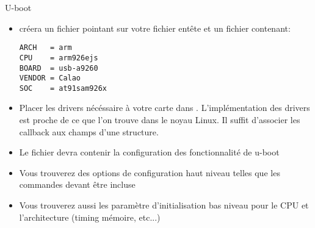 \begin{frame}[fragile=singleslide]{U-boot}
  \begin{itemize}
  \item {} créera  un fichier  pointant sur
    votre fichier entête et un fichier  contenant:
    \begin{lstlisting}
ARCH   = arm
CPU    = arm926ejs
BOARD  = usb-a9260
VENDOR = Calao
SOC    = at91sam926x
    \end{lstlisting}
  \item   Placer   les  drivers   nécéssaire   à   votre  carte   dans
    . L'implémentation des drivers est proche de
    ce que l'on  trouve dans le noyau Linux.  Il suffit d'associer les
    callback aux champs d'une structure.
  \item Le fichier   devra contenir la configuration
    des fonctionnalité de u-boot
  \item Vous trouverez des options de configuration haut niveau telles
    que les commandes devant être incluse
  \item Vous trouverez aussi les paramètre d'initialisation bas niveau
    pour le CPU et l'architecture (timing mémoire, etc...)
  \end{itemize}
\end{frame}





